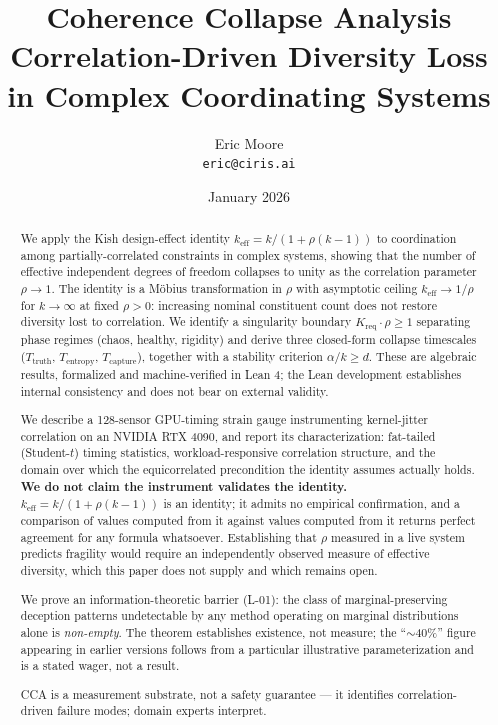 \documentclass[11pt,a4paper]{article}
\title{\textbf{Coherence Collapse Analysis}\\[0.5em]
\large Correlation-Driven Diversity Loss in Complex Coordinating Systems}
\author{
Eric Moore\\
\texttt{eric@ciris.ai}
}
\date{January 2026}
\theoremstyle{definition}
\theoremstyle{remark}
\newcommand{\keff}{k_{\text{eff}}}
\newcommand{\Kreq}{K_{\text{req}}}
\newcommand{\Ttruth}{T_{\text{truth}}}
\newcommand{\Tentropy}{T_{\text{entropy}}}
\newcommand{\Tcapture}{T_{\text{capture}}}
\begin{document}
\maketitle

\begin{abstract}
We apply the Kish design-effect identity $\keff = k/(1 + \rho(k-1))$ to coordination among partially-correlated constraints in complex systems, showing that the number of effective independent degrees of freedom collapses to unity as the correlation parameter $\rho \to 1$. The identity is a M\"obius transformation in $\rho$ with asymptotic ceiling $\keff \to 1/\rho$ for $k \to \infty$ at fixed $\rho > 0$: increasing nominal constituent count does not restore diversity lost to correlation. We identify a singularity boundary $\Kreq \cdot \rho \geq 1$ separating phase regimes (chaos, healthy, rigidity) and derive three closed-form collapse timescales ($\Ttruth$, $\Tentropy$, $\Tcapture$), together with a stability criterion $\alpha/k \geq d$. These are algebraic results, formalized and machine-verified in Lean 4; the Lean development establishes internal consistency and does not bear on external validity.

We describe a 128-sensor GPU-timing strain gauge instrumenting kernel-jitter correlation on an NVIDIA RTX 4090, and report its characterization: fat-tailed (Student-$t$) timing statistics, workload-responsive correlation structure, and the domain over which the equicorrelated precondition the identity assumes actually holds. \textbf{We do not claim the instrument validates the identity.} $\keff = k/(1+\rho(k-1))$ is an identity; it admits no empirical confirmation, and a comparison of values computed from it against values computed from it returns perfect agreement for any formula whatsoever. Establishing that $\rho$ measured in a live system predicts fragility would require an independently observed measure of effective diversity, which this paper does not supply and which remains open.

We prove an information-theoretic barrier (L-01): the class of marginal-preserving deception patterns undetectable by any method operating on marginal distributions alone is \emph{non-empty}. The theorem establishes existence, not measure; the ``$\sim$40\%'' figure appearing in earlier versions follows from a particular illustrative parameterization and is a stated wager, not a result.

CCA is a measurement substrate, not a safety guarantee --- it identifies correlation-driven failure modes; domain experts interpret.


\end{abstract}
\end{document}
